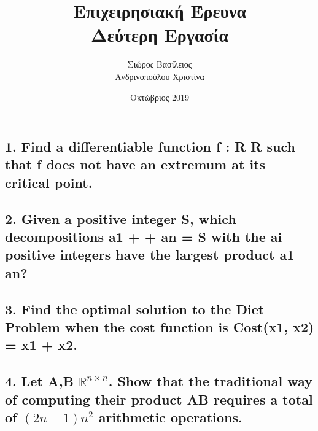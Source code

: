\documentclass[12pt]{article}
\title{\hugeΑλγοριθμική Επιχειρησιακή Έρευνα\\Δεύτερη Εργασία}
\author{Σιώρος Βασίλειος\\Ανδρινοπούλου Χριστίνα}
\date{Οκτώβριος 2019}
\newcommand{\R}{\mathbb{R}}
\begin{document}
\maketitle

\thispagestyle{empty}




\pagebreak

\subsection*{1. Find a differentiable function f : R R such that f does not have an extremum at its
critical point.}

\vspace{2in}


\pagebreak

\subsection*{2. Given a positive integer S, which decompositions
a1 + + an = S
with the ai positive integers have the largest product a1 an?}

\vspace{2in}


\pagebreak

\subsection*{3. Find the optimal solution to the Diet Problem when the cost function is
Cost(x1, x2) = x1 + x2.}

\vspace{2in}


\pagebreak

\subsection*{4. Let A,B $\R^{n\times n}$. Show that the traditional way of computing their product AB requires
a total of $(2n-1)n^2$ arithmetic operations.}
\end{document}
